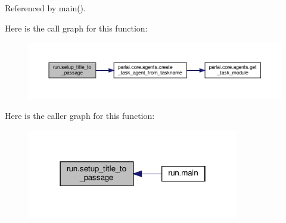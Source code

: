 Referenced by main().

Here is the call graph for this function\+:
\nopagebreak
\begin{figure}[H]
\begin{center}
\leavevmode
\includegraphics[width=350pt]{namespacerun_a8c0e38f5a5957dd35a11cc5d806887fd_cgraph}
\end{center}
\end{figure}
Here is the caller graph for this function\+:
\nopagebreak
\begin{figure}[H]
\begin{center}
\leavevmode
\includegraphics[width=262pt]{namespacerun_a8c0e38f5a5957dd35a11cc5d806887fd_icgraph}
\end{center}
\end{figure}
